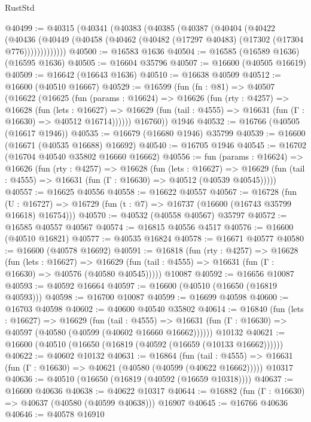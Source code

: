\begin{lexlean}{RustStd}
\begin{coremodule}
{\begin{coremodule}
{{{{{{{{{{{{{{{{{{{{{{{{{{{{{{{{{{{{{{{{{{{{{{{{{{{{{{{@40499 := @40315
    (@40341
      (@40383
        (@40385
          (@40387
            (@40404
              (@40422
                (@40436
                  (@40449 (@40458 (@40462 (@40482 (@17297 @40483) (@17302 (@17304 @776)))))))))))))
@40500 := @16583 @1636
@40504 := @16585 (@16589 @1636) (@16595 @1636)
@40505 := @16604 @35796
@40507 := @16600 (@40505 @16619)
@40509 := @16642 (@16643 @1636)
@40510 := @16638 @40509
@40512 := @16600 (@40510 @16667)
@40529 := @16599
    (fun (fn : @81) =>
    @40507
      (@16622
        (@16625
          (fun (params : @16624) =>
          @16626
            (fun (rty : @4257) =>
            @16628
              (fun (lets : @16627) =>
              @16629 (fun (tail : @4555) => @16631 (fun (Γ : @16630) => @40512 @16714))))))
        @16760))
    @1946
@40532 := @16766 (@40505 (@16617 @1946))
@40535 := @16679 (@16680 @1946) @35799
@40539 := @16600 (@16671 (@40535 @16688) @16692)
@40540 := @16705 @1946
@40545 := @16702 (@16704 @40540 @35802 @16660 @16662)
@40556 := fun (params : @16624) =>
  @16626
    (fun (rty : @4257) =>
    @16628
      (fun (lets : @16627) =>
      @16629 (fun (tail : @4555) => @16631 (fun (Γ : @16630) => @40512 (@40539 @40545)))))
@40557 := @16625 @40556
@40558 := @16622 @40557
@40567 := @16728
    (fun (U : @16727) => @16729 (fun (t : @7) => @16737 (@16600 (@16743 @35799 @16618) @16754)))
@40570 := @40532 (@40558 @40567) @35797
@40572 := @16585 @40557 @40567
@40574 := @16815 @40556 @4517
@40576 := @16600 (@40510 @16821)
@40577 := @40535 @16824
@40578 := @16671 @40577
@40580 := @16600 (@40578 @16692)
@40591 := @16818
    (fun (rty : @4257) =>
    @16628
      (fun (lets : @16627) =>
      @16629 (fun (tail : @4555) => @16631 (fun (Γ : @16630) => @40576 (@40580 @40545)))))
    @10087
@40592 := @16656 @10087
@40593 := @40592 @16664
@40597 := @16600 (@40510 (@16650 (@16819 @40593)))
@40598 := @16700 @10087
@40599 := @16699 @40598
@40600 := @16703 @40598
@40602 := @40600 @40540 @35802
@40614 := @16840
    (fun (lets : @16627) =>
    @16629
      (fun (tail : @4555) =>
      @16631 (fun (Γ : @16630) => @40597 (@40580 (@40599 (@40602 @16660 @16662))))))
    @10132
@40621 := @16600 (@40510 (@16650 (@16819 (@40592 (@16659 (@10133 @16662))))))
@40622 := @40602 @10132
@40631 := @16864
    (fun (tail : @4555) => @16631 (fun (Γ : @16630) => @40621 (@40580 (@40599 (@40622 @16662)))))
    @10317
@40636 := @40510 (@16650 (@16819 (@40592 (@16659 @10318))))
@40637 := @16600 @40636
@40638 := @40622 @10317
@40644 := @16882 (fun (Γ : @16630) => @40637 (@40580 (@40599 @40638))) @16907
@40645 := @16766 @40636
@40646 := @40578 @16910
}}}}}}}}}}}}}}}}}}}}}}}}}}}}}}}}}}}}}}}}}}}}}}}}}}}}}}}
\end{coremodule}}
\end{coremodule}
\end{lexlean}
